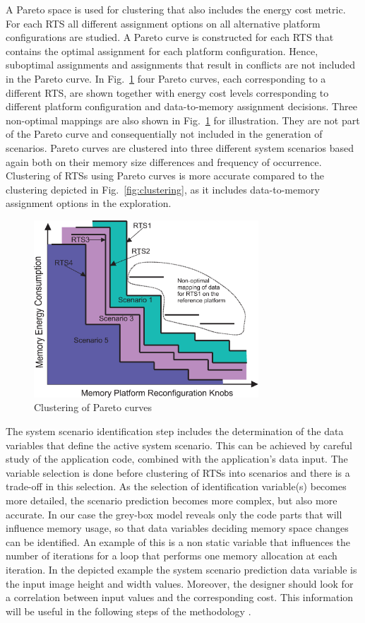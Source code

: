 \documentclass[smallextended]{svjour3}
\begin{document}
A Pareto space is used for clustering that also includes the energy cost metric. 
For each RTS all different assignment options on all alternative platform configurations are studied. 
A Pareto curve is constructed for each RTS that contains the optimal assignment for each platform configuration. 
Hence, suboptimal assignments and assignments that result in conflicts are not included in the Pareto curve. 
In Fig.~\ref{fig:pareto} four Pareto curves, each corresponding to a different RTS, are shown together with energy cost levels corresponding to different platform configuration and data-to-memory assignment decisions. 
Three non-optimal mappings are also shown in Fig.~\ref{fig:pareto} for illustration. 
They are not part of the Pareto curve and consequentially not included in the generation of scenarios. 
Pareto curves are clustered into three different system scenarios based again both on their memory size differences and frequency of occurrence. 
Clustering of RTSs using Pareto curves is more accurate compared to the clustering depicted in Fig.~\ref{fig:clustering}, as it includes data-to-memory assignment options in the exploration. 

\begin{figure}
\centering
\includegraphics[width=0.75\textwidth]{Images/2DClustering.eps}
\caption{Clustering of Pareto curves}
\label{fig:pareto}
\end{figure}

The system scenario identification step includes the determination of the data variables that define the active system scenario. 
This can be achieved by careful study of the application code, combined with the application's data input.
The variable selection is done before clustering of RTSs into scenarios and there is a trade-off in this selection.
As the selection of identification variable(s) becomes more detailed, the scenario prediction becomes more complex, but also more accurate. 
In our case the grey-box model reveals only the code parts that will influence memory usage, so that data variables deciding memory space changes can be identified. 
An example of this is a non static variable that influences the number of iterations for a loop that performs one memory allocation at each iteration. 
In the depicted example the system scenario prediction data variable is the input image height and width values. 
Moreover, the designer should look for a correlation between input values and the corresponding cost. 
This information will be useful in the following steps of the methodology \cite{tcm}.
\end{document}
